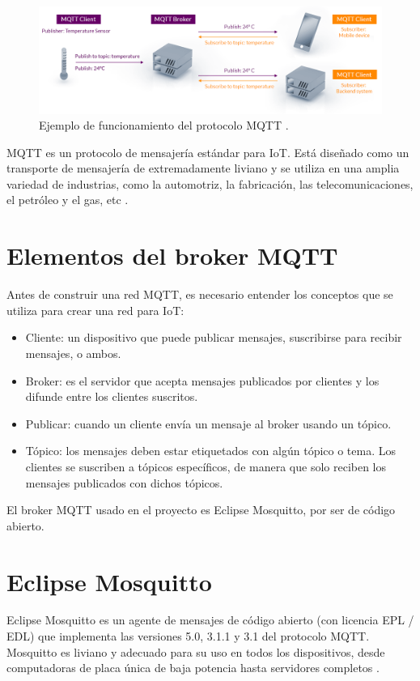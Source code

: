 \begin{itemize}
\vspace{0.5cm}

\begin{figure}[htbp]
	\centering
	\includegraphics[width=.9\textwidth]{./Figures/mqtt.png}
	\caption{Ejemplo de funcionamiento del protocolo MQTT \protect\footnotemark.}
	\label{fig:mqtt}
\end{figure}



MQTT es un protocolo de mensajería estándar para IoT. Está diseñado como un transporte de mensajería de extremadamente liviano y se utiliza en una amplia variedad de industrias, como la automotriz, la fabricación, las telecomunicaciones, el petróleo y el gas, etc \citep{WEBSITE:4}. 
\end{itemize}

\section{Elementos del broker MQTT}

Antes de construir una red MQTT, es necesario entender los conceptos que se utiliza para crear una red para IoT: 
\begin{itemize}
\item Cliente: un dispositivo que puede publicar mensajes, suscribirse para recibir mensajes, o ambos.
\item Broker: es el servidor que acepta mensajes publicados por clientes y los difunde entre los clientes suscritos.
\item Publicar: cuando un cliente envía un mensaje al broker usando un tópico.
\item Tópico: los mensajes deben estar etiquetados con algún tópico o tema. Los clientes se suscriben a tópicos específicos, de manera que solo reciben los mensajes publicados con dichos tópicos. 
\end{itemize}

El broker MQTT usado en el proyecto es Eclipse Mosquitto, por ser de código abierto.

\section{Eclipse Mosquitto} 
Eclipse Mosquitto es un agente de mensajes de código abierto (con licencia EPL / EDL) que implementa las versiones 5.0, 3.1.1 y 3.1 del protocolo MQTT. Mosquitto es liviano y adecuado para su uso en todos los dispositivos, desde computadoras de placa única de baja potencia hasta servidores completos \citep{WEBSITE:5}.

